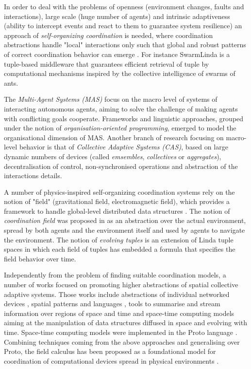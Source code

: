 In order to deal with the problems of openness (environment changes, faults and interactions), large scale (huge number of agents) and intrinsic adaptiveness (ability to intercept events and react to them to guarantee system resilience) an approach of \textit{self-organizing coordination} is needed, where coordination abstractions handle "local" interactions only such that global and robust patterns of correct coordination behavior can emerge \cite{Survey}. For instance SwarmLinda \cite{SwarmLinda} is a tuple-based middleware that guarantees efficient retrieval of tuple by computational mechanisms inspired by the collective intelligence of swarms of ants.

The \textit{Multi-Agent Systems (MAS)} focus on the macro level of systems of interacting autonomous agents, aiming to solve the challenge of making agents with conflicting goals cooperate. Frameworks and linguistic approaches, grouped under the notion of \textit{organisation-oriented programming}, emerged to model the organisational dimension of MAS. Another branch of research focusing on macro-level behavior is that of \textit{Collective Adaptive Systems (CAS)}, based on large dynamic numbers of devices (called \textit{emsembles}, \textit{collectives} or \textit{aggregates}), decentralisation of control, non-synchronised operations and abstraction of the interactions details.

A number of physics-inspired self-organizing coordination systems rely on the notion of "field" (gravitational field, electromagnetic field), which provides a framework to handle global-level distributed data structures \cite{Survey}. The notion of \textit{coordination field} was proposed in \cite{CoField} as an abstraction over the actual environment, spread by both agents and the environment itself and used by agents to navigate the environment. The notion of \textit{evolving tuples} \cite{EvolvingTuples} is an extension of Linda tuple spaces in which each field of tuples has embedded a formula that specifies the field behavior over time.

Independently from the problem of finding suitable coordination models, a number of works focused on promoting higher abstractions of spatial collective adaptive systems. Those works include abstractions of individual networked devices \cite{Hood}, spatial patterns and languages \cite{GrowingPoint}, tools to summarise and stream information over regions of space \cite{TinyDB} and time and space-time computing models aiming at the manipulation of data structures diffused in space and evolving with time. Space-time computing models were implemented in the Proto language \cite{Proto}. Combining techniques coming from the above approaches and generalising over Proto, the field calculus has been proposed as a foundational model for coordination of computational devices spread in physical environments \cite{Survey}.

